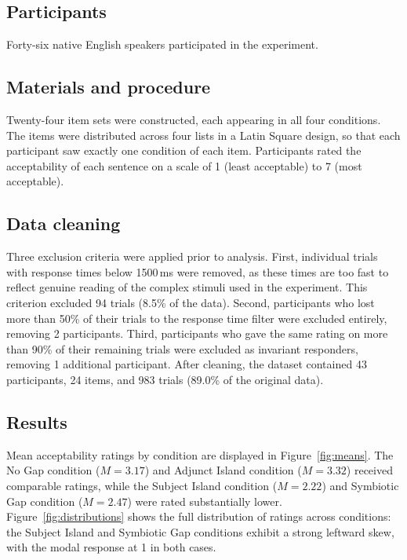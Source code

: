 \documentclass[12pt]{article}
\begin{document}
\subsection{Participants}\label{sec:exp-participants}

Forty-six native English speakers participated in the experiment.

\subsection{Materials and procedure}\label{sec:exp-materials}

Twenty-four item sets were constructed, each appearing in all four conditions. The items were distributed across four lists in a Latin Square design, so that each participant saw exactly one condition of each item. Participants rated the acceptability of each sentence on a scale of 1 (least acceptable) to 7 (most acceptable).

\subsection{Data cleaning}\label{sec:exp-cleaning}

Three exclusion criteria were applied prior to analysis. First, individual trials with response times below 1500\,ms were removed, as these times are too fast to reflect genuine reading of the complex stimuli used in the experiment. This criterion excluded 94 trials (8.5\% of the data). Second, participants who lost more than 50\% of their trials to the response time filter were excluded entirely, removing 2 participants. Third, participants who gave the same rating on more than 90\% of their remaining trials were excluded as invariant responders, removing 1 additional participant. After cleaning, the dataset contained 43 participants, 24 items, and 983 trials (89.0\% of the original data).

\subsection{Results}\label{sec:exp-results}

Mean acceptability ratings by condition are displayed in Figure~\ref{fig:means}. The No Gap condition ($M = 3.17$) and Adjunct Island condition ($M = 3.32$) received comparable ratings, while the Subject Island condition ($M = 2.22$) and Symbiotic Gap condition ($M = 2.47$) were rated substantially lower. Figure~\ref{fig:distributions} shows the full distribution of ratings across conditions: the Subject Island and Symbiotic Gap conditions exhibit a strong leftward skew, with the modal response at 1 in both cases.
\end{document}
